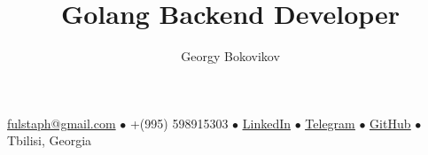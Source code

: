\documentclass[a4paper,12pt]{article} \raggedright
\makeatletter
\renewcommand{\maketitle}{
    {\Large\bfseries\theauthor}
    \vspace{.35em}

    {\bfseries\thetitle}

    \vspace{.25em}

    \underline{fulstaph@gmail.com} {\scriptsize$\bullet$}
    +(995) 598915303 {\scriptsize$\bullet$}
    \href{https://www.linkedin.com/in/bokovikovg/}{\underline{LinkedIn}} {\scriptsize$\bullet$}
    \href{https://t.me/fulstaph}{\underline{Telegram}} {\scriptsize$\bullet$}
    \href{https://github.com/fulstaph}{\underline{GitHub}} {\scriptsize$\bullet$} 
    Tbilisi, Georgia 
}
\makeatother
\begin{document}
\author{Georgy Bokovikov}
\title{Golang Backend Developer}
\maketitle






\end{document}
